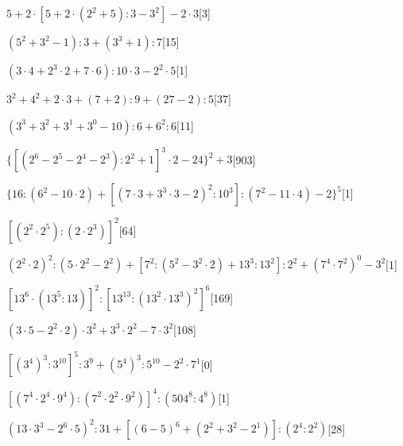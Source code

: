 \begin{esercizio} \label{ese:1.17}
$5+2\cdot[5+2\cdot(2^2+5):3-3^2]-2\cdot3$\hfill[3]
\end{esercizio}
\begin{esercizio} \label{ese:1.17}
$(5^2+3^2-1):3+(3^3+1):7$\hfill[15]
\end{esercizio}
\begin{esercizio} \label{ese:1.17}
$(3\cdot4+2^3\cdot2+7\cdot6):10\cdot3-2^2\cdot5$\hfill[1]
\end{esercizio}
\begin{esercizio} \label{ese:1.17}
$3^2+4^2+2\cdot3+(7+2):9+(27-2):5$\hfill[37]
\end{esercizio}
\begin{esercizio} \label{ese:1.17}
$(3^3+3^2+3^1+3^0-10):6+6^2:6$\hfill[11]
\end{esercizio}
\begin{esercizio} \label{ese:1.17}
$\{[(2^6-2^5-2^4-2^3):2^2+1]^3\cdot2-24\}^2+3$\hfill[903]
\end{esercizio}
\begin{esercizio} \label{ese:1.17}
$\{16:(6^2-10\cdot2)+[(7\cdot3+3^3\cdot3-2)^2:10^3]:(7^2-11\cdot4)-2\}^5$\hfill[1]
\end{esercizio}
\begin{esercizio} \label{ese:1.17}
$[(2^2\cdot2^5):(2\cdot2^3)]^2$\hfill[64]
\end{esercizio}
\begin{esercizio} \label{ese:1.17}
$(2^2\cdot2)^2:(5\cdot2^2-2^2)+[7^2:(5^2-3^2\cdot2)+13^3:13^2]:2^2+(7^4\cdot7^2)^0-3^2$\hfill[1]
\end{esercizio}
\begin{esercizio} \label{ese:1.17}
$[13^6\cdot(13^5:13)]^2:[13^{13}:(13^2\cdot13^3)^2]^6$\hfill[169]
\end{esercizio}
\begin{esercizio} \label{ese:1.17}
$(3\cdot5-2^2\cdot2)\cdot3^2+3^3\cdot2^2-7\cdot3^2$\hfill[108]
\end{esercizio}
\begin{esercizio} \label{ese:1.17}
$[(3^4)^3:3^{10}]^5:3^9+(5^4)^3:5^{10}-2^2\cdot7^1$\hfill[0]
\end{esercizio}
\begin{esercizio} \label{ese:1.17}
$[(7^4\cdot2^4\cdot9^4):(7^2\cdot2^2\cdot9^2)]^4:(504^8:4^8)$\hfill[1]
\end{esercizio}
\begin{esercizio} \label{ese:1.17}
$(13\cdot3^3-2^6\cdot5)^2:31+[(6-5)^6+(2^2+3^2-2^1)]:(2^4:2^2)$\hfill[28]
\end{esercizio}
